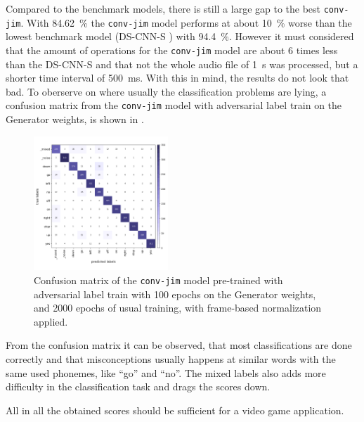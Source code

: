 Compared to the benchmark models, there is still a large gap to the best \texttt{conv-jim}.
With \SI{84.62}{\percent} the \texttt{conv-jim} model performs at about \SI{10}{\percent} worse than the lowest benchmark model (DS-CNN-S \cite{Zhang2017}) with \SI{94.4}{\percent}.
However it must considered that the amount of operations for the \texttt{conv-jim} model are about 6 times less than the DS-CNN-S and that not the whole audio file of \SI{1}{\second} was processed, but a shorter time interval of \SI{500}{\milli\second}.
With this in mind, the results do not look that bad.
To oberserve on where usually the classification problems are lying, a confusion matrix from the \texttt{conv-jim} model with adversarial label train on the Generator weights, is shown in .
\begin{figure}[!ht]
  \centering
  \includegraphics[width=0.45\textwidth]{./5_exp/figs/exp_final_confusion}
  \caption{Confusion matrix of the \texttt{conv-jim} model pre-trained with adversarial label train with 100 epochs on the Generator weights, and 2000 epochs of usual training, with frame-based normalization applied.}
  \label{fig:exp_final_confusion}
\end{figure}
\FloatBarrier
\noindent
From the confusion matrix it can be observed, that most classifications are done correctly and that misconceptions usually happens at similar words with the same used phonemes, like \enquote{go} and \enquote{no}.
The mixed labels also adds more difficulty in the classification task and drags the scores down.

All in all the obtained scores should be sufficient for a video game application.
